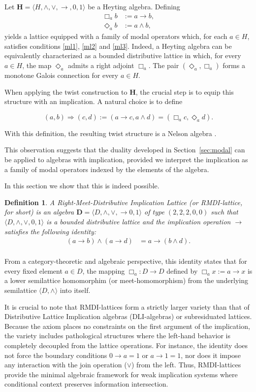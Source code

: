 \documentclass[10pt,a4paper]{amsart}
\newtheorem{definition}[theorem]{Definition}
\newcommand{\D}{\mathbf{D}}
\begin{document}
Let $\mathbf{H}=\langle H,\wedge,\vee,\to,0,1\rangle$ be a Heyting algebra. Defining
\begin{align*}
    \Box_a b &:= a \to b,\\
    \Diamond_a b &:= a \wedge b,
\end{align*}
yields a lattice equipped with a family of modal operators which, for each $a \in H$, satisfies
conditions \eqref{ml1}, \eqref{ml2} and \eqref{ml3}. Indeed, a Heyting algebra can be equivalently characterized as a bounded distributive lattice in which, for every $a\in H$, the map $\Diamond_a$ admits a right adjoint $\Box_a$. The pair $(\Diamond_a,\Box_a)$ forms a monotone Galois connection for every $a\in H$. 

When applying the twist construction to $\mathbf{H}$, the crucial step is to equip this structure with an implication. A natural choice is to define

\[(a,b)\Rightarrow(c,d):= (a\to c,a\wedge d)=(\Box_ac,\Diamond_ad).\]

With this definition, the resulting twist structure is a Nelson algebra \cite{sendlewski1990nelson}.

This observation suggests that the duality
developed in Section~\ref{sec:modal} can be applied to algebras with implication, provided we interpret
the implication as a family of modal operators indexed by the elements of the algebra.

In this section we show that this is indeed possible.
\begin{definition}
A \emph{Right-Meet-Distributive Implication Lattice} (or RMDI-lattice, for short) is an algebra $\D=\langle D, \wedge, \vee,\to 0, 1\rangle$ of type $(2, 2, 2, 0, 0)$ such that $\langle D, \wedge, \vee, 0, 1\rangle$ is a bounded distributive lattice and the implication operation $\to$ satisfies the following identity:
\begin{align*}
    (a \to b) \wedge (a \to d) &= a \to (b \wedge d). \tag{I1}\label{I1}\\
\end{align*}
\end{definition}

From a category-theoretic and algebraic perspective, this identity states that for every fixed element $a \in D$, the mapping $\Box_a: D \to D$ defined by $\Box_ax := a \to x$ is a lower semilattice homomorphim (or meet-homomorphism) from the underlying semilattice $\langle D, \wedge\rangle$ into itself.

It is crucial to note that RMDI-lattices form a strictly larger variety than that of Distributive Lattice Implication algebras (DLI-algebras) or subresiduated lattices. Because the axiom places no constraints on the first argument of the implication, the variety includes pathological structures where the left-hand behavior is completely decoupled from the lattice operations. For instance, the identity does not force the boundary conditions $0 \to a = 1$ or $a \to 1 = 1$, nor does it impose any interaction with the join operation ($\vee$) from the left. Thus, RMDI-lattices provide the minimal algebraic framework for weak implication systems where conditional context preserves information intersection.
 
\end{document}
